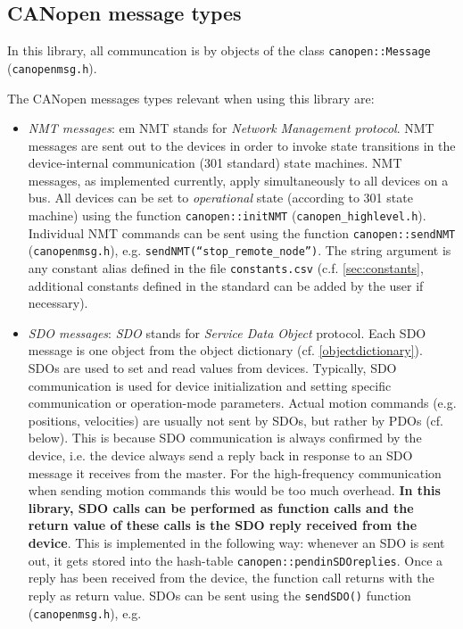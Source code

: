 \subsection{CANopen message types}

In this library, all communcation is by objects of the class \texttt{canopen::Message} (\texttt{canopenmsg.h}).

The CANopen messages types relevant when using this library are:
\begin{itemize}
\item {\em NMT messages}: {em NMT} stands for {\em Network Management protocol}. NMT messages are sent out to the devices in order to invoke state transitions in the device-internal communication (301 standard) state machines. NMT messages, as implemented currently, apply simultaneously to all devices on a bus. All devices can be set to {\em operational} state (according to 301 state machine) using the function \texttt{canopen::initNMT} (\texttt{canopen\_highlevel.h}). Individual NMT commands can be sent using the function \texttt{canopen::sendNMT} (\texttt{canopenmsg.h}), e.g. \texttt{sendNMT(``stop\_remote\_node'')}. The string argument is any constant alias defined in the file \texttt{constants.csv} (c.f. \ref{sec:constants}, additional constants defined in the standard can be added by the user if necessary).
\item {\em SDO messages}: {\em SDO} stands for {\em Service Data Object} protocol. Each SDO message is one object from the object dictionary (cf. \ref{objectdictionary}). SDOs are used to set and read values from devices. Typically, SDO communication is used for device initialization and setting specific communication or operation-mode parameters. Actual motion commands (e.g. positions, velocities) are usually not sent by SDOs, but rather by PDOs (cf. below). This is because SDO communication is always confirmed by the device, i.e. the device always send a reply back in response to an SDO message it receives from the master. For the high-frequency communication when sending motion commands this would be too much overhead. {\bf In this library, SDO calls can be performed as function calls and the return value of these calls is the SDO reply received from the device}. This is implemented in the following way: whenever an SDO is sent out, it gets stored into the hash-table \texttt{canopen::pendinSDOreplies}. Once a reply has been received from the device, the function call returns with the reply as return value. SDOs can be sent using the \texttt{sendSDO()} function (\texttt{canopenmsg.h}), e.g.

\end{itemize}

